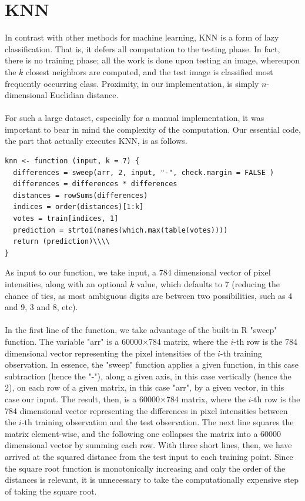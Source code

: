 \documentclass[10pt]{extarticle}
\begin{document}
\section{KNN}
In contrast with other methods for machine learning, KNN is a form of lazy classification. That is, it defers all computation to the testing phase. In fact, there is no training phase; all the work is done upon testing an image, whereupon the $k$ closest neighbors are computed, and the test image is classified most frequently occurring class. Proximity, in our implementation, is simply $n$-dimensional Euclidian distance.\\\\
For such a large dataset, especially for a manual implementation, it was important to bear in mind the complexity of the computation. Our essential code, the part that actually executes KNN, is as follows. 
\begin{verbatim}
knn <- function (input, k = 7) {
  differences = sweep(arr, 2, input, "-", check.margin = FALSE )
  differences = differences * differences
  distances = rowSums(differences)
  indices = order(distances)[1:k]
  votes = train[indices, 1]
  prediction = strtoi(names(which.max(table(votes))))
  return (prediction)\\\\
}
\end{verbatim}
As input to our function, we take input, a 784 dimensional vector of pixel intensities, along with an optional $k$ value, which defaults to 7 (reducing the chance of ties, as most ambiguous digits are between two possibilities, such as 4 and 9, 3 and 8, etc). \\\\
In the first line of the function, we take advantage of the built-in R "sweep" function. The variable "arr" is a 60000$\times$784 matrix, where the $i$-th row is the 784 dimensional vector representing the pixel intensities of the $i$-th training observation. In essence, the "sweep" function applies a given function, in this case subtraction (hence the "-"), along a given axis, in this case vertically (hence the 2), on each row of a given matrix, in this case "arr", by a given vector, in this case our input. The result, then, is a 60000$\times$784 matrix, where the $i$-th row is the 784 dimensional vector representing the differences in pixel intensities between the $i$-th training observation and the test observation. The next line squares the matrix element-wise, and the following one collapses the matrix into a 60000 dimensional vector by summing each row. With three short lines, then, we have arrived at the squared distance from the test input to each training point. Since the square root function is monotonically increasing and only the order of the distances is relevant, it is unnecessary to take the computationally expensive step of taking the square root. \\\\
\end{document}
